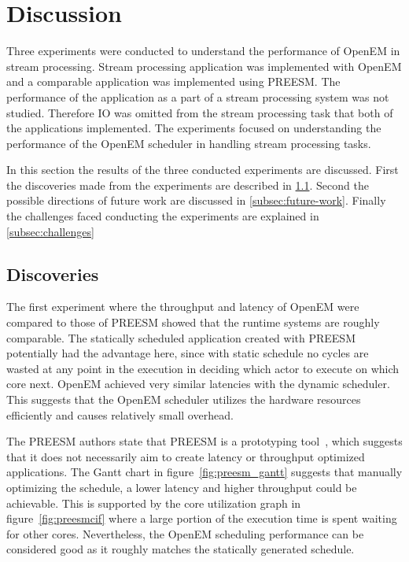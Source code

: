 \section{Discussion}
\label{sec:discussion}
Three experiments were conducted to understand the performance of OpenEM in stream processing. Stream processing application was implemented with OpenEM and a comparable application was implemented using PREESM. The performance of the application as a part of a stream processing system was not studied. Therefore IO was omitted from the stream processing task that both of the applications implemented.  The experiments focused on understanding the performance of the OpenEM scheduler in handling stream processing tasks.

In this section the results of the three conducted experiments are discussed. First the discoveries made from the experiments are described in \ref{subsec:discoveries}. Second the possible directions of future work are discussed in \ref{subsec:future-work}. Finally the challenges faced conducting the experiments are explained in \ref{subsec:challenges}

\subsection{Discoveries}
\label{subsec:discoveries}
\FloatBarrier
The first experiment where the throughput and latency of OpenEM were compared to those of PREESM showed that the runtime systems are roughly comparable. The statically scheduled application created with PREESM potentially had the advantage here, since with static schedule no cycles are wasted at any point in the execution in deciding which actor to execute on which core next. OpenEM achieved very similar latencies with the dynamic scheduler. This suggests that the OpenEM scheduler utilizes the hardware resources efficiently and causes relatively small overhead.

The PREESM authors state that PREESM is a prototyping tool~\cite{preesm}, which suggests that it does not necessarily aim to create latency or throughput optimized applications. The Gantt chart in figure~\ref{fig:preesm_gantt} suggests that manually optimizing the schedule, a lower latency and higher throughput could be achievable. This is supported by the core utilization graph in figure~\ref{fig:preesmcif} where a large portion of the execution time is spent waiting for other cores. Nevertheless, the OpenEM scheduling performance can be considered good as it roughly matches the statically generated schedule.


